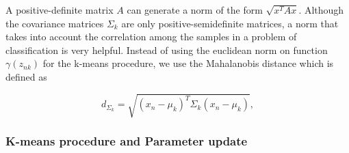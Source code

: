 \documentclass[letterpaper, 10 pt, conference]{ieeeconf}  %
\begin{document}
A positive-definite matrix $A$ can generate a norm of the form $\sqrt{x^{T}Ax}$. Although the covariance matrices $\Sigma_{k}$ are only positive-semidefinite 
matrices, a norm that takes into account the correlation among the samples in a problem of classification is very helpful. Instead of using the euclidean norm on 
function $\gamma(z_{nk})$ for the k-means procedure, we use the Mahalanobis distance which is defined as

\begin{equation*}
 d_{\Sigma_{k}} = \sqrt{(x_{n} - \mu_{k})^{T}\Sigma_{k} (x_{n} - \mu_{k})},
\end{equation*}

\subsubsection{K-means procedure and Parameter update}
\label{sec:Experiment_Kmeans_procedure}
\end{document}
